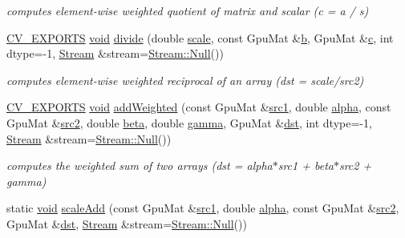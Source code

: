 \begin{DoxyCompactItemize}
\begin{DoxyCompactList}\small\item\em computes element-\/wise weighted quotient of matrix and scalar (c = a / s) \end{DoxyCompactList}\item 
\hyperlink{core_2types__c_8h_a1bf9f0e121b54272da02379cfccd0a2b}{C\-V\-\_\-\-E\-X\-P\-O\-R\-T\-S} \hyperlink{legacy_8hpp_a8bb47f092d473522721002c86c13b94e}{void} \hyperlink{namespacecv_1_1gpu_ad1261b1170d44af08a81d1a699841d67}{divide} (double \hyperlink{objdetect_8hpp_a1f622eb9b9e06b30862ca90cdf2c078b}{scale}, const Gpu\-Mat \&\hyperlink{legacy_8hpp_ac04272e8ca865b8fba18d36edae9fd2a}{b}, Gpu\-Mat \&\hyperlink{legacy_8hpp_a1971420173e06f45845eed2ab4e3d5d0}{c}, int dtype=-\/1, \hyperlink{classcv_1_1gpu_1_1Stream}{Stream} \&stream=\hyperlink{classcv_1_1gpu_1_1Stream_af96c23564834f88333dcb8997df553f1}{Stream\-::\-Null}())
\begin{DoxyCompactList}\small\item\em computes element-\/wise weighted reciprocal of an array (dst = scale/src2) \end{DoxyCompactList}\item 
\hyperlink{core_2types__c_8h_a1bf9f0e121b54272da02379cfccd0a2b}{C\-V\-\_\-\-E\-X\-P\-O\-R\-T\-S} \hyperlink{legacy_8hpp_a8bb47f092d473522721002c86c13b94e}{void} \hyperlink{namespacecv_1_1gpu_a30cb3e79cf515fb1ec25a31967b1bab3}{add\-Weighted} (const Gpu\-Mat \&\hyperlink{core__c_8h_a897de4702c922f4cccda0d57ccdcafb3}{src1}, double \hyperlink{legacy_8hpp_a95fc8341ca418bc06b36160632af6d47}{alpha}, const Gpu\-Mat \&\hyperlink{core__c_8h_a7561a36d48069d54a6c8ac4e4750edfd}{src2}, double \hyperlink{legacy_8hpp_af8b31eb489dfbd87f3b1a1925cca3589}{beta}, double \hyperlink{legacy_8hpp_a977df9847c7e455667f9fdaa49fbaa11}{gamma}, Gpu\-Mat \&\hyperlink{photo__c_8h_aed13e2a25279b24dc954073233fef7a5}{dst}, int dtype=-\/1, \hyperlink{classcv_1_1gpu_1_1Stream}{Stream} \&stream=\hyperlink{classcv_1_1gpu_1_1Stream_af96c23564834f88333dcb8997df553f1}{Stream\-::\-Null}())
\begin{DoxyCompactList}\small\item\em computes the weighted sum of two arrays (dst = alpha$\ast$src1 + beta$\ast$src2 + gamma) \end{DoxyCompactList}\item 
static \hyperlink{legacy_8hpp_a8bb47f092d473522721002c86c13b94e}{void} \hyperlink{namespacecv_1_1gpu_a27b59934321fc69994cd15ca7fc17ecb}{scale\-Add} (const Gpu\-Mat \&\hyperlink{core__c_8h_a897de4702c922f4cccda0d57ccdcafb3}{src1}, double \hyperlink{legacy_8hpp_a95fc8341ca418bc06b36160632af6d47}{alpha}, const Gpu\-Mat \&\hyperlink{core__c_8h_a7561a36d48069d54a6c8ac4e4750edfd}{src2}, Gpu\-Mat \&\hyperlink{photo__c_8h_aed13e2a25279b24dc954073233fef7a5}{dst}, \hyperlink{classcv_1_1gpu_1_1Stream}{Stream} \&stream=\hyperlink{classcv_1_1gpu_1_1Stream_af96c23564834f88333dcb8997df553f1}{Stream\-::\-Null}())

\end{DoxyCompactItemize}
